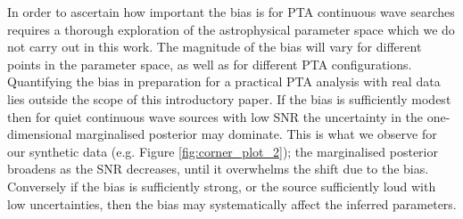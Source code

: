 \documentclass[fleqn,usenatbib,useAMS]{mnras}
\begin{document}
In order to ascertain how important the bias is for PTA continuous wave searches requires a thorough exploration of the astrophysical parameter space which we do not carry out in this work. The magnitude of the bias will vary for different points in the parameter space, as well as for different PTA configurations. Quantifying the bias in preparation for a practical PTA analysis with real data lies outside the scope of this introductory paper. If the bias is sufficiently modest then for quiet continuous wave sources with low SNR the uncertainty in the one-dimensional marginalised posterior may dominate. This is what we observe for our synthetic data (e.g. Figure \ref{fig:corner_plot_2}); the marginalised posterior broadens as the SNR decreases, until it overwhelms the shift due to the bias. Conversely if the bias is sufficiently strong, or the source sufficiently loud with low uncertainties, then the bias may systematically affect the inferred parameters. \newline  




\end{document}
